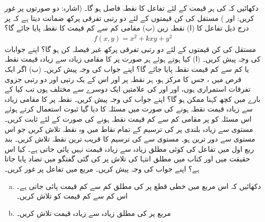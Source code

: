دکھائیں کہ   کی ہر قیمت کے لئے   تفاعل  کا نقطہ فاصل ہو گا۔ (اشارہ: دو صورتوں پر غور کریں:  اور )
مستقل  کی کن قیمتوں کے لئے دو رتبی تفرقی پرکھ ضمانت دیتا ہے کہ   پر درج ذیل تفاعل  کا (ا)  نقطہ زین (ب) مقامی کم سے کم قیمت  کا نقطہ   پایا جائے گا؟
\begin{align*}
f(x,y)=x^2+kxy+y^2
\end{align*}
  مستقل  کی کن قیمتوں کے لئے دو رتبی تفرقی پرکھ غیر  فیصلہ کن ہو گا؟ اپنے جوابات کی وجہ پیش کریں۔
(ا) کیا  ہوتے ہوئے ہر   صورت  پر  کا مقامی زیادہ سے  زیادہ قیمت  نقطہ یا کم سے کم قیمت  نقطہ پایا جائے گا؟ اپنے جواب کی وجہ پیش کریں۔   (ب)  اگر ایک قرص  میں ، جس کا مرکز   ہو،  ہر نقطہ پر   اور اس کے یک رتبی اور دو رتبی جزوی تفرقات استمراری ہوں، اور  اور  کی علامتیں ایک دوسرے سے مختلف ہوں  تب کیا  کے بارے میں کچھ کہنا ممکن ہو گا؟ اپنے جواب کی وجہ پیش کریں۔
نقطہ  پر   کا   مقامی  زیادہ سے زیادہ قیمت  نقطہ ہونے کی صورت میں  مسئلہ  کا دیا گیا  ثبوت استعمال کرتے ہوئے  اس مسئلہ کو  پر مقامی کم سے کم قیمت  نقطہ ہونے کی صورت کے لئے ثابت کریں۔
مستوی   سے   زیادہ بلندی  پر   کی ترسیم کے تمام نقاط میں وہ نقطہ تلاش کریں جو اس مستوی سے دور ترین ہو۔
مستوی  سے  کی ترسیم کا قریب ترین نقطہ تلاش کریں۔
بند ربع اول  میں تفاعل  کی کوئی مطلق زیادہ سے زیادہ قیمت نہیں پائی جاتی ہے۔ کیا  اس حقیقت میں اور    کتاب میں  مطلق انتہا کی تلاش پر کی گئی گفتگو  میں تضاد پایا جاتا ہے؟ اپنے جواب کی وجہ پیش کریں۔
مربع  میں تفاعل  پر غور کریں۔
\begin{enumerate}[a.]
\item
دکھائیں کہ  اس مربع میں خطی قطع  پر  کی مطلق کم سے کم  قیمت پائی جاتی ہے۔ اس کم سے کم قیمت کو تلاش کریں۔
\item
مربع پر  کی مطلق زیادہ سے زیادہ قیمت تلاش کریں۔
\end{enumerate}

